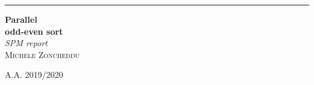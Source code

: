 \documentclass[a4paper, 12pt]{article}
\begin{document}
\begin{titlepage}
	\raggedleft
	\rule{1pt}{\textheight}
	\hspace{0.05\textwidth} 
	\parbox[b]{0.85\textwidth}{
		
		{\Huge\bfseries Parallel \\[0.5\baselineskip] odd-even sort}\\[2\baselineskip]
		{\large\textit{SPM report}}\\[4\baselineskip]
		{\large\textsc{Michele Zoncheddu}}
		
		\vspace{0.5\textheight}
		
		{\noindent A.A. 2019/2020}\\[\baselineskip]
	}
\end{titlepage}



	\sloppy

	
	
	\clearpage
	
	\clearpage
	
\end{document}
